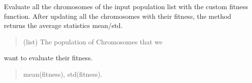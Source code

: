 \documentclass[letterpaper,10pt,english]{sphinxmanual}
\begin{document}
\begin{fulllineitems}
\begin{fulllineitems}
\label{\detokenize{pygenalgo.engines:pygenalgo.engines.island_model_ga.IslandModelGA.evaluate_fitness}}
\pysigstartsignatures
\pysiglinewithargsret
{}
{\sphinxparamcomma {}}
{}
\pysigstopsignatures
\sphinxAtStartPar
Evaluate all the chromosomes of the input population list with the
custom fitness  function. After updating all  the chromosomes with
their fitness, the method returns the average statistics mean/std.
\begin{quote}\begin{description}
\sphinxAtStartPar
{} \textendash{} (list) The population of Chromosomes that we

\end{description}\end{quote}

\sphinxAtStartPar
want to evaluate their fitness.
\begin{quote}\begin{description}
\sphinxAtStartPar
mean(fitness), std(fitness).

\end{description}\end{quote}

\end{fulllineitems}



\end{fulllineitems}
\end{document}
